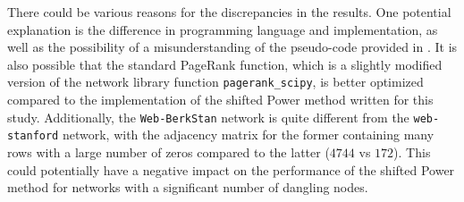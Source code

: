  \noindent There could be various reasons for the discrepancies in the results. One potential explanation is the difference in programming language and implementation, as well as the possibility of a misunderstanding of the pseudo-code provided in \cite{SHEN2022126799}. It is also possible that the standard PageRank function, which is a slightly modified version of the network library function \texttt{pagerank\_scipy}, is better optimized compared to the implementation of the shifted Power method written for this study. Additionally, the \texttt{Web-BerkStan} network is quite different from the \texttt{web-stanford} network, with the adjacency matrix for the former containing many rows with a large number of zeros compared to the latter ($4744$ vs $172$). This could potentially have a negative impact on the performance of the shifted Power method for networks with a significant number of dangling nodes.
